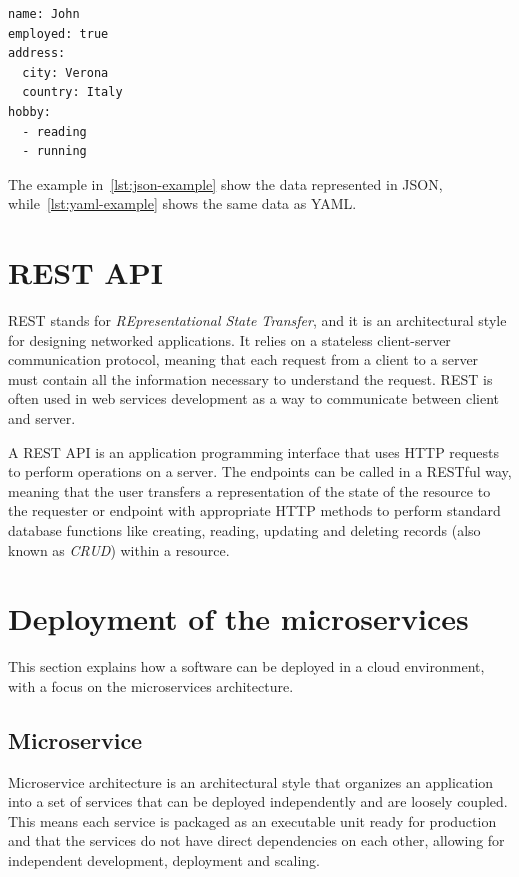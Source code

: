 \begin{minipage}{\linewidth}
  \begin{lstlisting}[style=yaml, caption={YAML example}, label={lst:yaml-example}]
name: John
employed: true
address:
  city: Verona
  country: Italy
hobby:
  - reading
  - running
  \end{lstlisting}
\end{minipage}

The example in~\cref{lst:json-example} show the data represented in JSON, while~\cref{lst:yaml-example} shows the same data as YAML.

\section{REST API}

REST stands for \textit{REpresentational State Transfer}, and it is an architectural style for designing networked applications. It relies on a stateless client-server communication protocol, meaning that each request from a client to a server must contain all the information necessary to understand the request. REST is often used in web services development as a way to communicate between client and server.

A REST API is an application programming interface that uses HTTP requests to perform operations on a server. The endpoints can be called in a RESTful way, meaning that the user transfers a representation of the state of the resource to the requester or endpoint with appropriate HTTP methods to perform standard database functions like creating, reading, updating and deleting records (also known as \textit{CRUD}) within a resource.~\cite{rest-api}

\section{Deployment of the microservices}

This section explains how a software can be deployed in a cloud environment, with a focus on the microservices architecture.

\subsection{Microservice}

Microservice architecture is an architectural style that organizes an application into a set of services that can be deployed independently and are loosely coupled. This means each service is packaged as an executable unit ready for production and that the services do not have direct dependencies on each other, allowing for independent development, deployment and scaling.~\cite{microservices-what-are}

